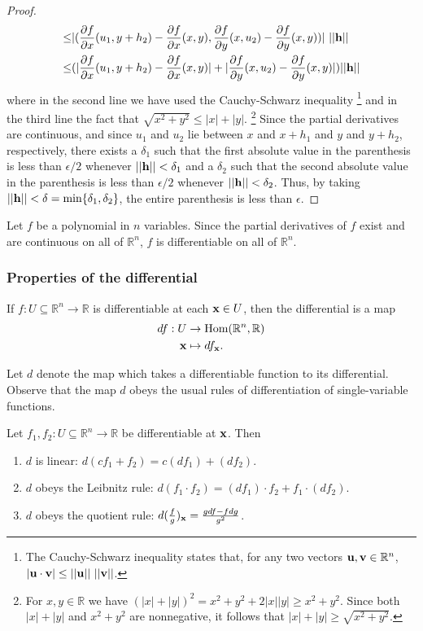 \documentclass[12pt,letterpaper,reqno]{article}
\numberwithin{equation}{section}
\newcommand{\R}{\ensuremath{\mathbb R}}
\newcommand{\bu}{{\bf u}}
\newcommand{\bv}{{\bf v}}
\newcommand{\bx}{{\bf x}}
\begin{document}
{\begin{proof}
\begin{align*}
	 \leq &|(\frac{\partial f}{\partial x}(u_1,y+h_2)-\frac{\partial f}{\partial x}(x,y), \frac{\partial f}{\partial y}(x,u_2)-\frac{\partial f}{\partial y}(x,y))| \ ||{\bf h}|| \\
	 \leq &(|\frac{\partial f}{\partial x}(u_1,y+h_2)-\frac{\partial f}{\partial x}(x,y)|+|\frac{\partial f}{\partial y}(x,u_2)-\frac{\partial f}{\partial y}(x,y)|)||{\bf h}||
\end{align*}
where in the second line we have used the Cauchy-Schwarz inequality \footnote{The Cauchy-Schwarz inequality states that, for any two vectors $\bu, \bv \in \R^n$, $|\bu \cdot \bv| \leq ||\bu|| \ ||\bv||$.} and in the third line the fact that $\sqrt{x^2+y^2}\leq |x|+|y|$. \footnote{For $x,y \in \R$ we have $(|x|+|y|)^2=x^2+y^2+2|x||y| \geq x^2+y^2$. Since both $|x|+|y|$ and $x^2+y^2$ are nonnegative, it follows that $|x|+|y| \geq \sqrt{x^2+y^2}$.} Since the partial derivatives are continuous, and since $u_1$ and $u_2$ lie between $x$ and $x+h_1$ and $y$ and $y+h_2$, respectively, there exists a $\delta_1$ such that the first absolute value in the parenthesis is less than $\epsilon/2$ whenever $||{\bf h}||<\delta_1$ and a $\delta_2$ such that the second absolute value in the parenthesis is less than $\epsilon/2$ whenever $||{\bf h}||<\delta_2$. Thus, by taking $||{\bf h}||<\delta=\text{min}\{\delta_1,\delta_2\}$, the entire parenthesis is less than $\epsilon$.
\end{proof}

\begin{example}
Let $f$ be a polynomial in $n$ variables. Since the partial derivatives of $f$ exist and are continuous on all of $\R^n$, $f$ is differentiable on all of $\R^n$.	
\end{example}


\subsubsection{Properties of the differential}
If $f:U \subseteq \R^n \to \R$ is differentiable at each $\bx \in U$, then the differential is a map
\begin{align*}
	df:U &\to \text{Hom}(\R^n,\R) \\
	\bx &\mapsto df_\bx.
\end{align*}

Let $d$ denote the map which takes a differentiable function to its differential. Observe that the map $d$ obeys the usual rules of differentiation of single-variable functions. 

\begin{thm}\label{thm:algebraic_properties_of_the_differential}
Let $f_1,f_2:U \subseteq \R^n \to \R$ be differentiable at $\bx$. Then
\begin{enumerate}[(1)]
	\item $d$ is linear: $d(cf_1+f_2)=c(df_1)+(df_2)$.
	\item $d$ obeys the Leibnitz rule: $d(f_1 \cdot f_2)=(df_1) \cdot f_2+f_1 \cdot (df_2)$.
	\item $d$ obeys the quotient rule: $d(\frac{f}{g})_\bx=\frac{g df-fdg}{g^2}$.
\end{enumerate}	
\end{thm}

}
\end{document}
